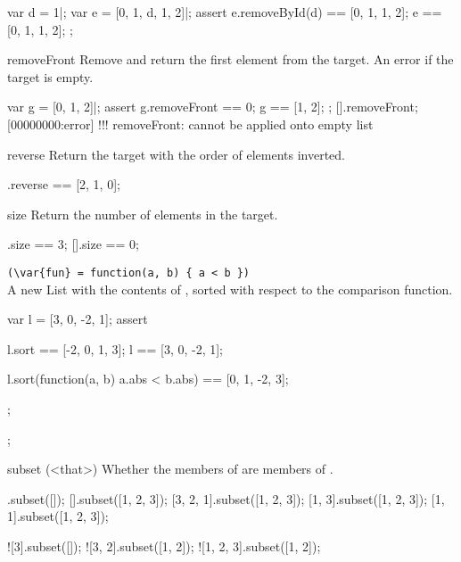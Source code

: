 \begin{urbiscriptapi}
\begin{urbiscript}
var d = 1|;
var e = [0, 1, d, 1, 2]|;
assert
{
  e.removeById(d) == [0, 1, 1, 2];
  e == [0, 1, 1, 2];
};
\end{urbiscript}

\item[removeFront]
Remove and return the first element from the target. An error if the
target is empty.

\begin{urbiscript}
var g = [0, 1, 2]|;
assert
{
  g.removeFront == 0;
  g == [1, 2];
};
[].removeFront;
[00000000:error] !!! removeFront: cannot be applied onto empty list
\end{urbiscript}

\item[reverse]
Return the target with the order of elements inverted.

\begin{urbiassert}
[0, 1, 2].reverse == [2, 1, 0];
\end{urbiassert}

\item[size]
Return the number of elements in the target.

\begin{urbiassert}
[0, 1, 2].size == 3;
[].size == 0;
\end{urbiassert}

\item {}\lstinline|(\var{fun} = function(a, b) { a < b })|\\%
  A new List with the contents of \this, sorted with respect to the
   comparison function.

\begin{urbiscript}
{
  var l = [3, 0, -2, 1];
  assert
  {
    l.sort == [-2, 0, 1, 3];
    l      == [3, 0, -2, 1];

    l.sort(function(a, b) {a.abs < b.abs})
           == [0, 1, -2, 3];
  };
};
\end{urbiscript}

\item[subset](<that>)%
  Whether the members of \this are members of .

\begin{urbiassert}
        [].subset([]);
        [].subset([1, 2, 3]);
 [3, 2, 1].subset([1, 2, 3]);
    [1, 3].subset([1, 2, 3]);
    [1, 1].subset([1, 2, 3]);

      ![3].subset([]);
   ![3, 2].subset([1, 2]);
![1, 2, 3].subset([1, 2]);
\end{urbiassert}


\end{urbiscriptapi}
